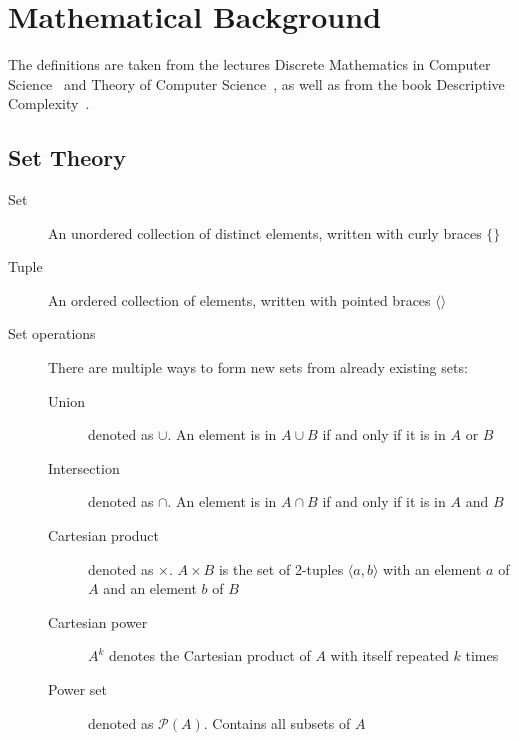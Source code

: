 \chapter{Mathematical Background}\label{ch:mathematical-background}

The definitions are taken from the lectures Discrete Mathematics in Computer Science~\cite{discrete-maths} and Theory of Computer Science~\cite{theory-cs}, as well as from the book Descriptive Complexity~\cite{descriptive-complexity}.


\section{Set Theory}\label{sec:set-theory}
\begin{description}
    \item[Set] An unordered collection of distinct elements, written with curly braces $\{\}$
    \item[Tuple] An ordered collection of elements, written with pointed braces $\langle  \rangle$
    \item[Set operations] There are multiple ways to form new sets from already existing sets:
    \begin{description}
        \item[Union] denoted as $\cup$.
        An element is in $A \cup B$ if and only if it is in $A$ or $B$
        \item[Intersection] denoted as $\cap$.
        An element is in $A \cap B$ if and only if it is in $A$ and $B$
        \item[Cartesian product] denoted as $\times$. $A \times B$ is the set of 2-tuples $\langle a, b\rangle$ with an element $a$ of $A$ and an element $b$ of $B$
        \item[Cartesian power] $A^k$ denotes the Cartesian product of $A$ with itself repeated $k$ times
        \item[Power set] denoted as $\mathcal{P}(A)$.
        Contains all subsets of $A$
    \end{description}
\end{description}


